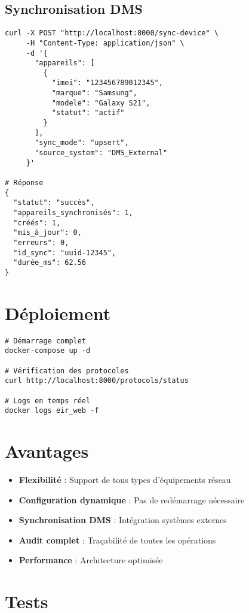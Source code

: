 \documentclass[11pt]{article}
\begin{document}
\subsection{Synchronisation DMS}
\begin{lstlisting}[caption=Synchronisation d'appareils]
curl -X POST "http://localhost:8000/sync-device" \
     -H "Content-Type: application/json" \
     -d '{
       "appareils": [
         {
           "imei": "123456789012345",
           "marque": "Samsung",
           "modele": "Galaxy S21",
           "statut": "actif"
         }
       ],
       "sync_mode": "upsert",
       "source_system": "DMS_External"
     }'

# Réponse
{
  "statut": "succès",
  "appareils_synchronisés": 1,
  "créés": 1,
  "mis_à_jour": 0,
  "erreurs": 0,
  "id_sync": "uuid-12345",
  "durée_ms": 62.56
}
\end{lstlisting}

\section{Déploiement}

\begin{lstlisting}[caption=Docker Compose]
# Démarrage complet
docker-compose up -d

# Vérification des protocoles
curl http://localhost:8000/protocols/status

# Logs en temps réel
docker logs eir_web -f
\end{lstlisting}

\section{Avantages}

\begin{itemize}
    \item \textbf{Flexibilité} : Support de tous types d'équipements réseau
    \item \textbf{Configuration dynamique} : Pas de redémarrage nécessaire
    \item \textbf{Synchronisation DMS} : Intégration systèmes externes
    \item \textbf{Audit complet} : Traçabilité de toutes les opérations
    \item \textbf{Performance} : Architecture optimisée
\end{itemize}

\section{Tests}
\end{document}
